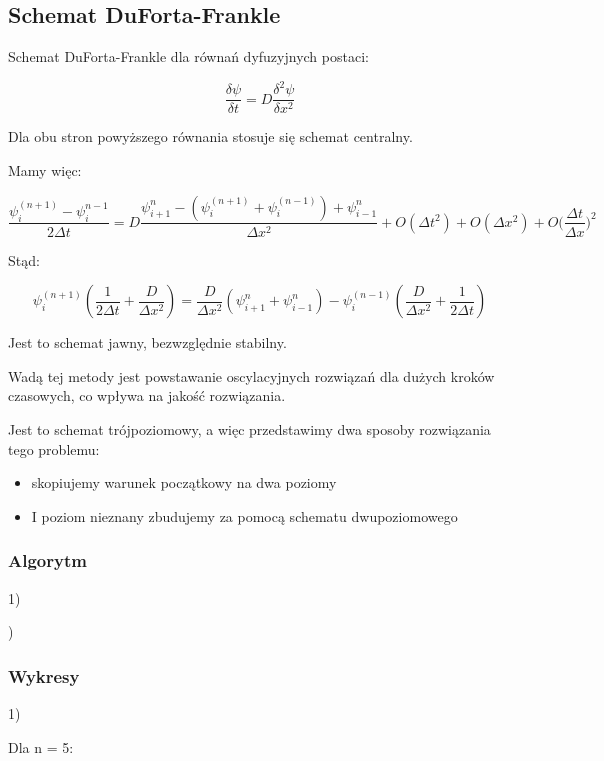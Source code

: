 \newpage
\subsection{Schemat DuForta-Frankle}
Schemat DuForta-Frankle dla równań dyfuzyjnych postaci:

$$\dfrac{\delta \psi}{\delta t} = D\dfrac{\delta^2 \psi}{\delta x^2}$$

Dla obu stron powyższego równania stosuje się schemat centralny.

Mamy więc:

$$\dfrac{\psi^{(n+1)}_{i}-\psi^{n-1}_{i}}{2\Delta t}=D\dfrac{\psi^{n}_{i+1}- \left( \psi^{(n+1)}_{i} + \psi^{(n-1)}_{i} \right)+\psi^n_{i-1}}{\Delta x^2} + O(\Delta t^2) + O(\Delta x^2) +  O\Big(\dfrac{\Delta t}{\Delta x}\Big)^2$$

Stąd:

$$\psi^{(n+1)}_{i} \left(\dfrac{1}{2 \Delta t} + \dfrac{D}{\Delta x^2}\right)= \dfrac{D}{\Delta x^2} \left( \psi^{n}_{i+1} + \psi^{n}_{i-1} \right) - \psi^{(n-1)}_{i} \left( \dfrac{D}{\Delta x^2} + \dfrac{1}{2\Delta t} \right) $$

Jest to schemat jawny, bezwzględnie stabilny. 

Wadą tej metody jest powstawanie oscylacyjnych rozwiązań dla dużych kroków czasowych, co wpływa na jakość rozwiązania.

Jest to schemat trójpoziomowy, a więc przedstawimy dwa sposoby rozwiązania tego problemu:
\begin{itemize}
	\item skopiujemy warunek początkowy na dwa poziomy
	\item I poziom nieznany zbudujemy za pomocą schematu dwupoziomowego
\end{itemize}

\newpage
\subsubsection{Algorytm}
1)

)

\newpage
\subsubsection{Wykresy}
1)

Dla n = 5:

